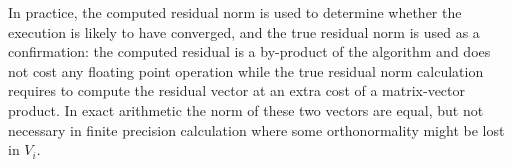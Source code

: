 \documentclass[twoside]{article}
\begin{document}
In practice, the computed residual norm is used to determine whether the execution is likely to have converged, and the true residual norm is used as a confirmation: the computed residual is a by-product of the algorithm and does not cost any floating point operation while the true residual norm calculation
requires to compute the residual vector at an extra cost of a matrix-vector product. In exact arithmetic the norm of these two vectors are equal,
but not necessary in finite precision calculation where some orthonormality might be lost in $V_i$.
\end{document}
